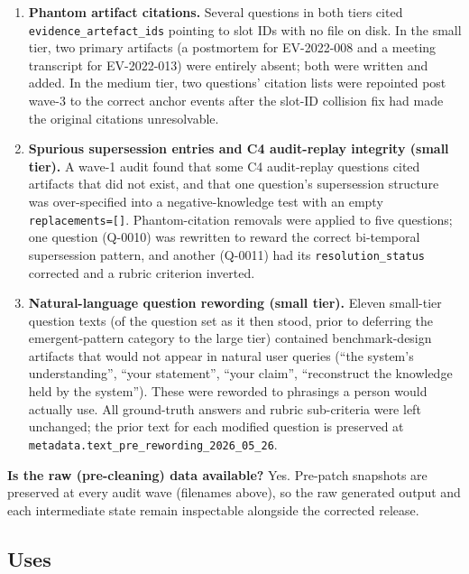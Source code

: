 \begin{enumerate}
{    been applied earlier to the small tier.\par}
  \item \textbf{Phantom artifact citations.} Several questions in both tiers
    cited \texttt{evidence\_artefact\_ids} pointing to slot IDs with no file on
    disk. In the small tier, two primary artifacts (a postmortem for EV-2022-008
    and a meeting transcript for EV-2022-013) were entirely absent; both were
    written and added. In the medium tier, two questions' citation lists were
    repointed post wave-3 to the correct anchor events after the slot-ID
    collision fix had made the original citations unresolvable.
  \item \textbf{Spurious supersession entries and C4 audit-replay integrity
    (small tier).} A wave-1 audit found that some C4 audit-replay questions cited
    artifacts that did not exist, and that one question's supersession structure
    was over-specified into a negative-knowledge test with an empty
    \texttt{replacements=[]}. Phantom-citation removals were applied to five
    questions; one question (Q-0010) was rewritten to reward the correct
    bi-temporal supersession pattern, and another (Q-0011) had its
    \texttt{resolution\_status} corrected and a rubric criterion inverted.
  \item \textbf{Natural-language question rewording (small tier).} Eleven small-tier
    question texts (of the question set as it then stood, prior to deferring the
    emergent-pattern category to the large tier) contained benchmark-design
    artifacts that
    would not appear in natural user queries (``the system's understanding'',
    ``your statement'', ``your claim'', ``reconstruct the knowledge held by the
    system''). These were reworded to phrasings a person would actually use. All
    ground-truth answers and rubric sub-criteria were left unchanged; the prior
    text for each modified question is preserved at
    \texttt{metadata.text\_pre\_rewording\_2026\_05\_26}.
\end{enumerate}

\textbf{Is the raw (pre-cleaning) data available?}
Yes. Pre-patch snapshots are preserved at every audit wave (filenames above), so
the raw generated output and each intermediate state remain inspectable alongside
the corrected release.

\subsection{Uses}

